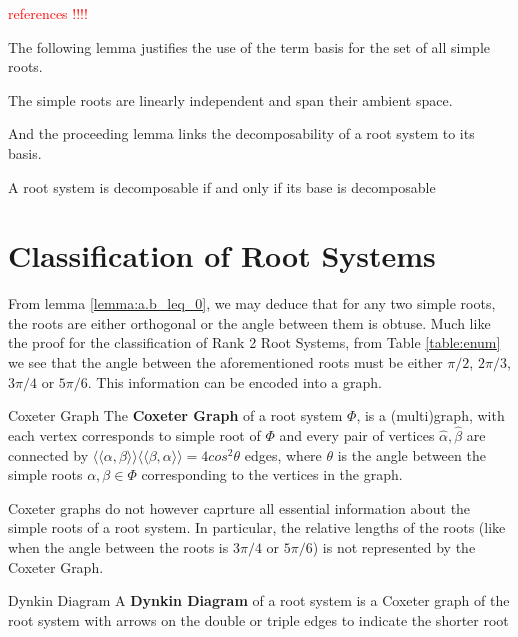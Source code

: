 \textcolor{red}{references !!!!}

The following lemma justifies the use of the term basis for the set of all simple roots.
\begin{lemma}
    \label{lemma:admit_config}
    The simple roots are linearly independent and span their ambient space.
\end{lemma}

And the proceeding lemma links the decomposability of a root system to its basis.
\begin{lemma}
    \label{lemma:decomp}
    A root system is decomposable if and only if its base is decomposable
\end{lemma}

\section{Classification of Root Systems}

From lemma \ref{lemma:a.b_leq_0}, we may deduce that for any two simple roots, the roots are either
orthogonal or the angle between them is obtuse. Much like the proof for the classification of Rank 2
Root Systems, from Table \ref{table:enum} we see that the angle between the aforementioned roots must
be either $\pi/2$, $2\pi/3$, $3\pi/4$ or $5\pi/6$. This information can be encoded into a graph. \newline

\begin{nameddefinition}{Coxeter Graph}
    The \textbf{Coxeter Graph} of a root system $\Phi$, is a (multi)graph, with each vertex
    corresponds to simple root of $\Phi$ and every pair of vertices $\hat\alpha, \hat\beta$ are
    connected by $\langle \langle \alpha, \beta \rangle \rangle \langle \langle \beta, \alpha \rangle \rangle = 
    4cos^2\theta$ edges, where $\theta$ is the angle between the simple roots $\alpha, \beta \in \Phi$
    corresponding to the vertices in the graph.
\end{nameddefinition}

Coxeter graphs do not however caprture all essential information about the simple roots of a root system.
In particular, the relative lengths of the roots (like when the angle between the roots is $3\pi/4$ or $5\pi/6$)
is not represented by the Coxeter Graph. \newline

\begin{nameddefinition}{Dynkin Diagram}
    A \textbf{Dynkin Diagram} of a root system is a Coxeter graph of the root system with arrows on
    the double or triple edges to indicate the shorter root
\end{nameddefinition}

